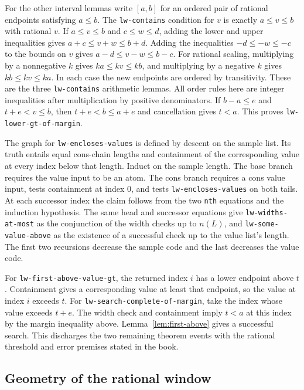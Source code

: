 \documentclass[11pt]{amsart}
\theoremstyle{definition}
\theoremstyle{remark}
\numberwithin{equation}{section}
\newcommand{\code}[1]{\nolinkurl{#1}}
\begin{document}
For the other interval lemmas write $[a,b]$ for an ordered pair of
rational endpoints satisfying $a\le b$. The \code{lw-contains}
condition for $v$ is exactly $a\le v\le b$ with rational $v$.
If $a\le v\le b$ and $c\le w\le d$, adding the lower and upper
inequalities gives $a+c\le v+w\le b+d$. Adding the inequalities
$-d\le -w\le -c$ to the bounds on $v$ gives
$a-d\le v-w\le b-c$. For rational scaling, multiplying by a
nonnegative $k$ gives $ka\le kv\le kb$, and multiplying by a
negative $k$ gives $kb\le kv\le ka$. In each case the new
endpoints are ordered by transitivity. These are the three
\code{lw-contains} arithmetic lemmas. All order rules here are
integer inequalities after multiplication by positive denominators.
If $b-a\le e$ and $t+e<v\le b$, then $t+e<b\le a+e$ and
cancellation gives $t<a$. This proves \code{lw-lower-gt-of-margin}.

The graph for \code{lw-encloses-values} is defined by descent on
the sample list. Its truth entails equal cons-chain lengths and
containment of the corresponding value at every index below that
length. Induct on the sample length. The base branch requires
the value input to be an atom. The cons branch requires a cons
value input, tests containment at index $0$, and tests
\code{lw-encloses-values} on both tails. At each successor index
the claim follows from the two \texttt{nth} equations and the
induction hypothesis. The same head and successor equations
give \code{lw-widths-at-most} as the conjunction of the width
checks up to $n(L)$, and \code{lw-some-value-above} as the
existence of a successful check up to the value list's length.
The first two recursions decrease the sample code and the last
decreases the value code.

For \code{lw-first-above-value-gt}, the returned index $i$ has a
lower endpoint above $t$. Containment gives a corresponding
value at least that endpoint, so the value at index $i$ exceeds
$t$. For \code{lw-search-complete-of-margin}, take the index
whose value exceeds $t+e$. The width check and containment
imply $t<a$ at this index by the margin inequality above.
Lemma~\ref{lem:first-above} gives a successful search. This
discharges the two remaining theorem events with the rational
threshold and error premises stated in the book.

\subsection{Geometry of the rational window}
\end{document}

